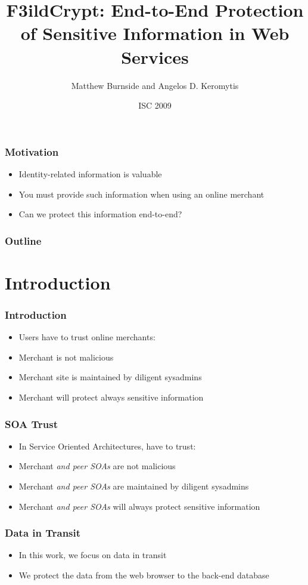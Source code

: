 \documentclass{beamer}
\title[F3ildCrypt]{F3ildCrypt: End-to-End Protection of Sensitive Information
in Web Services}
\author[Burnside, Keromytis]{Matthew Burnside and Angelos D. Keromytis}
\institute[Columbia University]{
Department of Computer Science\\
Columbia University\\
\texttt{\{mb, angelos\}@cs.columbia.edu}
}
\date{ISC 2009}
\begin{document}
\begin{frame}[plain]
    \titlepage
\end{frame}

\begin{frame}
\frametitle{Motivation}
\begin{itemize}
\item Identity-related information is valuable
\item You must provide such information when using an online merchant
\item Can we protect this information end-to-end?
\end{itemize}
\end{frame}

\begin{frame}
\frametitle{Outline}
\tableofcontents
\end{frame}

\section{Introduction}

\begin{frame}
\frametitle{Introduction}
\begin{itemize}
\item Users have to trust online merchants:
\item Merchant is not malicious
\item Merchant site is maintained by diligent sysadmins
\item Merchant will protect always sensitive information
\end{itemize}
\end{frame}

\begin{frame}
\frametitle{SOA Trust}
\begin{itemize}
\item In Service Oriented Architectures, have to trust:
\item Merchant \emph{and peer SOAs} are not malicious
\item Merchant \emph{and peer SOAs} are maintained by diligent sysadmins
\item Merchant \emph{and peer SOAs} will always protect sensitive information
\end{itemize}
\end{frame}

\begin{frame}
\frametitle{Data in Transit}
\begin{itemize}
\item In this work, we focus on data in transit
\item We protect the data from the web browser to the back-end database
\end{itemize}
\end{frame}
\end{document}
